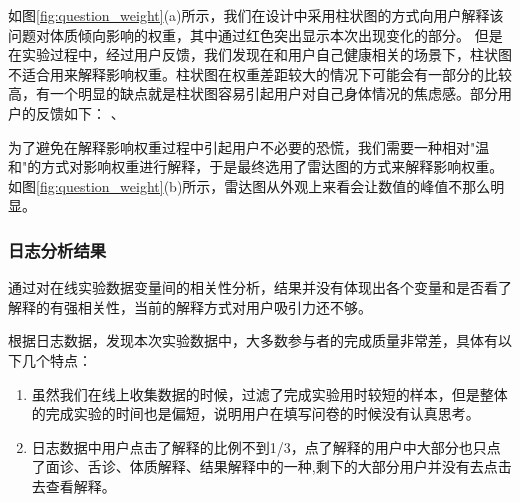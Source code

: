 如图\ref{fig:question_weight}(a)所示，我们在设计中采用柱状图的方式向用户解释该问题对体质倾向影响的权重，其中通过红色突出显示本次出现变化的部分。
但是在实验过程中，经过用户反馈，我们发现在和用户自己健康相关的场景下，柱状图不适合用来解释影响权重。柱状图在权重差距较大的情况下可能会有一部分的比较高，有一个明显的缺点就是柱状图容易引起用户对自己身体情况的焦虑感。部分用户的反馈如下：
、

为了避免在解释影响权重过程中引起用户不必要的恐慌，我们需要一种相对"温和"的方式对影响权重进行解释，于是最终选用了雷达图的方式来解释影响权重。
如图\ref{fig:question_weight}(b)所示，雷达图从外观上来看会让数值的峰值不那么明显。

\subsubsection{日志分析结果}

通过对在线实验数据变量间的相关性分析，结果并没有体现出各个变量和是否看了解释的有强相关性，当前的解释方式对用户吸引力还不够。

根据日志数据，发现本次实验数据中，大多数参与者的完成质量非常差，具体有以下几个特点：

\begin{enumerate}
    \item 虽然我们在线上收集数据的时候，过滤了完成实验用时较短的样本，但是整体的完成实验的时间也是偏短，说明用户在填写问卷的时候没有认真思考。

    \item 日志数据中用户点击了解释的比例不到1/3，点了解释的用户中大部分也只点了面诊、舌诊、体质解释、结果解释中的一种,剩下的大部分用户并没有去点击去查看解释。
\end{enumerate}








